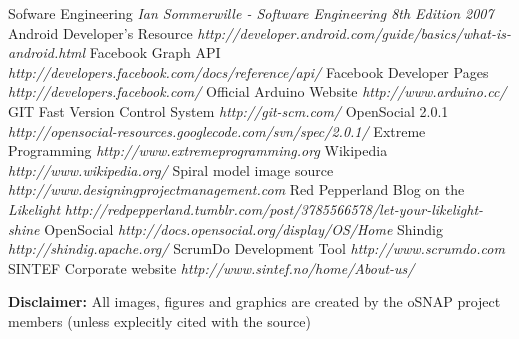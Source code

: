 \begin{thebibliography}{99}
 Sofware Engineering {\em Ian Sommerwille - Software Engineering 8th Edition 2007}
 Android Developer's Resource  {\em http://developer.android.com/guide/basics/what-is-android.html}
 Facebook Graph API {\em http://developers.facebook.com/docs/reference/api/}
 Facebook Developer Pages {\em http://developers.facebook.com/}
 Official Arduino Website {\em http://www.arduino.cc/}
 GIT Fast Version Control System {\em http://git-scm.com/}
 OpenSocial 2.0.1 {\em http://opensocial-resources.googlecode.com/svn/spec/2.0.1/}
 Extreme Programming {\em http://www.extremeprogramming.org}
 Wikipedia {\em http://www.wikipedia.org/ }
 Spiral model image source {\em http://www.designingprojectmanagement.com}
 Red Pepperland Blog on the \emph{Likelight} {\em http://redpepperland.tumblr.com/post/3785566578/let-your-likelight-shine}
 OpenSocial {\em http://docs.opensocial.org/display/OS/Home}
 Shindig {\em http://shindig.apache.org/}
 ScrumDo Development Tool {\em http://www.scrumdo.com}
 SINTEF Corporate website {\em http://www.sintef.no/home/About-us/}
\end{thebibliography}


\textbf{Disclaimer:}
All images, figures and graphics are created by the oSNAP project members (unless explecitly cited with the source) 
